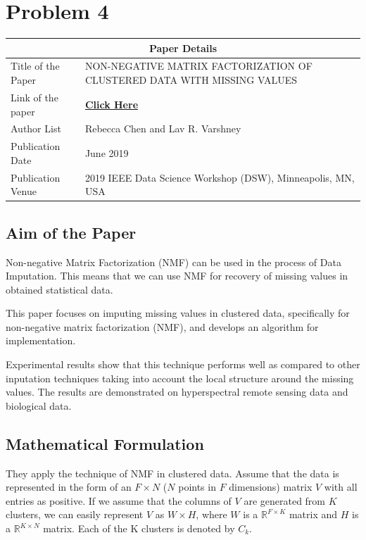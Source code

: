 \documentclass[a4paper,14pt]{article}
\numberwithin{definition}{section}
\numberwithin{mytheorem}{subsection}
\begin{document}
\section{Problem 4}



\begin{center}
    \begin{tabular}{ |p{3.5cm}||p{10cm}|}
   
    \hline
    \multicolumn{2}{|c|}{Paper Details} \\
    \hline
    Title of the Paper& NON-NEGATIVE MATRIX FACTORIZATION OF
    CLUSTERED DATA WITH MISSING VALUES\\
    \hline
    Link of the paper  &  \href{https://ieeexplore.ieee.org/document/8755555}{\textbf{Click Here}}  \\
    \hline
    Author List & Rebecca Chen and Lav R. Varshney\\
    \hline
    Publication Date  & June 2019 \\
    \hline
    Publication Venue  &  2019 IEEE Data Science Workshop (DSW), Minneapolis, MN, USA \\
    \hline
   \end{tabular}
\end{center}

\subsection{Aim of the Paper}

Non-negative Matrix Factorization (NMF) can be used in the process of Data Imputation. This means that we can use NMF for recovery of missing values in obtained statistical data.

This paper focuses on imputing missing values in clustered data, specifically for non-negative matrix factorization (NMF), and develops an algorithm for implementation.

Experimental results show that this technique performs well as compared to other inputation techniques taking into account the local structure around the missing values. The results are demonstrated on hyperspectral remote sensing
data and biological data.


\subsection{Mathematical Formulation}

They apply the technique of NMF in clustered data. Assume that the data is represented in the form of an $F\times N$ ($N$ points in $F$ dimensions) matrix $V$ with all entries as positive. If we assume that the columns of $V$ are generated from $K$ clusters, we can easily represent $V$ as $W\times H$, where $W$ is a $\mathbb{R}^{F \times K}$ matrix and $H$ is a $\mathbb{R}^{K \times N}$ matrix. Each of the K clusters is denoted by $C_k$.
\end{document}
